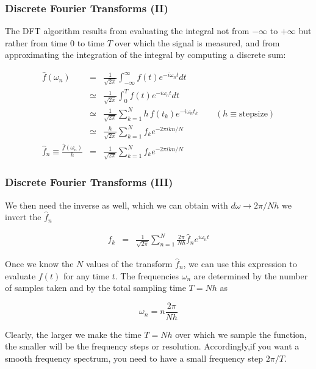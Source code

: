 \documentclass[hyperref={colorlinks=true}]{beamer}
\begin{document}
\begin{frame}%
  \frametitle{Discrete Fourier Transforms (II)}

  The DFT algorithm results from evaluating the integral not from $-\infty$ to $+\infty$ but rather from time $0$ to time $T$ over which the signal is measured, and from approximating the integration of the integral by computing a discrete sum:
  
  \begin{eqnarray}
    \hat{f}(\omega_n) &=& \frac{1}{\sqrt{2\pi}} \int_{-\infty}^{\infty} f(t)   e^{-i\omega_n t}   dt \\
                 &\simeq& \frac{1}{\sqrt{2\pi}} \int_{0}^{T}            f(t)   e^{-i\omega_n t}   dt \\
                 &\simeq& \frac{1}{\sqrt{2\pi}} \sum_{k=1}^{N}     h \, f(t_k) e^{-i\omega_n t_k} \qquad (h\equiv\mathrm{stepsize}) \\
                 &\simeq& \frac{h}{\sqrt{2\pi}} \sum_{k=1}^{N}          f_k    e^{-2\pi i k n/N}     \\
    \hat{f}_n \equiv \frac{\hat{f}(\omega_n)}{h} &=& \frac{1}{\sqrt{2\pi}} \sum_{k=1}^{N}  f_k  e^{-2\pi i k n/N}  
  \end{eqnarray}
  
\end{frame}


\begin{frame}%
  \frametitle{Discrete Fourier Transforms (III)}

  We then need the inverse as well, which we can obtain with $d\omega \rightarrow 2\pi/Nh $ we invert the $\hat{f}_n $
      
  \begin{eqnarray}
    f_k &=& \frac{1}{\sqrt{2\pi}} \sum_{n=1}^{N} \frac{2\pi}{Nh}  \hat{f}_n  e^{i\omega_n t}  
  \end{eqnarray}
  
  Once we know the $N$ values of the transform $\hat{f}_n$, we can use this expression to evaluate $f(t)$ for any time $t$. The frequencies $\omega_n$ are determined by the number of samples taken and by the total sampling time $T = N h$ as
  
  \begin{equation}
    \omega_n = n\frac{2\pi}{Nh}
  \end{equation}
  
  Clearly, the larger we make the time $T = Nh$ over which we sample the function, the smaller will be the frequency steps or resolution. Accordingly,if you want a smooth frequency spectrum, you need to have a small frequency step $2\pi/T$.
  
\end{frame}
\end{document}
